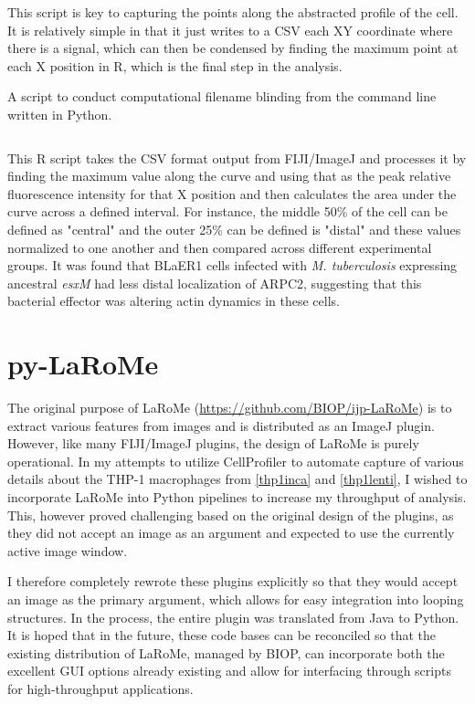 This script is key to capturing the points along the abstracted profile of the cell. It is relatively simple in that it just writes to a CSV each XY coordinate where there is a signal, which can then be condensed by finding the maximum point at each X position in R, which is the final step in the analysis.

\begin{code}
\caption{A script to conduct computational filename blinding from the command line written in Python.}
\label{blinder}

\inputminted[breaklines,frame=single,fontsize=\small]{r}{source/surface_plot_analysis.R}

\end{code}

This R script takes the CSV format output from FIJI/ImageJ and processes it by finding the maximum value along the curve and using that as the peak relative fluorescence intensity for that X position and then calculates the area under the curve across a defined interval. For instance, the middle 50\% of the cell can be defined as "central" and the outer 25\% can be defined is "distal" and these values normalized to one another and then compared across different experimental groups. It was found that BLaER1 cells infected with \textit{M. tuberculosis} expressing ancestral \textit{esxM} had less distal localization of ARPC2, suggesting that this bacterial effector was altering actin dynamics in these cells.

\section{py-LaRoMe}\label{larome}

The original purpose of LaRoMe (\url{https://github.com/BIOP/ijp-LaRoMe}) is to extract various features from images and is distributed as an ImageJ plugin. However, like many FIJI/ImageJ plugins, the design of LaRoMe is purely operational. In my attempts to utilize CellProfiler \citep{Carpenter2006, Kamentsky2011, McQuin2018, Stirling2021} to automate capture of various details about the THP-1 macrophages from \autoref{thp1inca} and \autoref{thp1lenti}, I wished to incorporate LaRoMe into Python pipelines to increase my throughput of analysis. This, however proved challenging based on the original design of the plugins, as they did not accept an image as an argument and expected to use the currently active image window.

I therefore completely rewrote these plugins explicitly so that they would accept an image as the primary argument, which allows for easy integration into looping structures. In the process, the entire plugin was translated from Java to Python. It is hoped that in the future, these code bases can be reconciled so that the existing distribution of LaRoMe, managed by BIOP, can incorporate both the excellent GUI options already existing and allow for interfacing through scripts for high-throughput applications.

